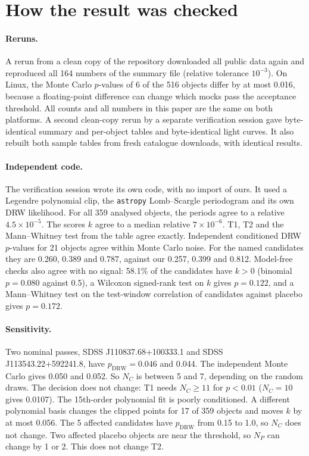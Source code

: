 \documentclass[11pt]{article}
\begin{document}
\section{How the result was checked}
\paragraph{Reruns.} A rerun from a clean copy of the repository downloaded all public data again and reproduced all 164 numbers of the summary file (relative tolerance $10^{-3}$). On Linux, the Monte Carlo $p$-values of 6 of the 516 objects differ by at most 0.016, because a floating-point difference can change which mocks pass the acceptance threshold. All counts and all numbers in this paper are the same on both platforms. A second clean-copy rerun by a separate verification session gave byte-identical summary and per-object tables and byte-identical light curves. It also rebuilt both sample tables from fresh catalogue downloads, with identical results.

\paragraph{Independent code.} The verification session wrote its own code, with no import of ours. It used a Legendre polynomial clip, the \texttt{astropy} Lomb--Scargle periodogram and its own DRW likelihood. For all 359 analysed objects, the periods agree to a relative $4.5\times10^{-5}$. The scores $k$ agree to a median relative $7\times10^{-6}$. T1, T2 and the Mann--Whitney test from the table agree exactly. Independent conditioned DRW $p$-values for 21 objects agree within Monte Carlo noise. For the named candidates they are 0.260, 0.389 and 0.787, against our 0.257, 0.399 and 0.812. Model-free checks also agree with no signal: 58.1\% of the candidates have $k>0$ (binomial $p=0.080$ against 0.5), a Wilcoxon signed-rank test on $k$ gives $p=0.122$, and a Mann--Whitney test on the test-window correlation of candidates against placebo gives $p=0.172$.

\paragraph{Sensitivity.} Two nominal passes, SDSS J110837.68+100333.1 and SDSS J113543.22+592241.8, have $p_\text{DRW}=0.046$ and 0.044. The independent Monte Carlo gives 0.050 and 0.052. So $N_C$ is between 5 and 7, depending on the random draws. The decision does not change: T1 needs $N_C\ge 11$ for $p<0.01$ ($N_C=10$ gives 0.0107). The 15th-order polynomial fit is poorly conditioned. A different polynomial basis changes the clipped points for 17 of 359 objects and moves $k$ by at most 0.056. The 5 affected candidates have $p_\text{DRW}$ from 0.15 to 1.0, so $N_C$ does not change. Two affected placebo objects are near the threshold, so $N_P$ can change by 1 or 2. This does not change T2.
\end{document}
